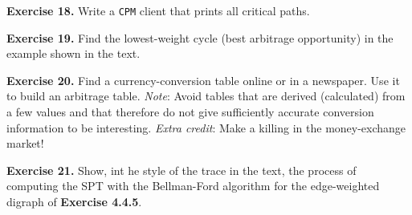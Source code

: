 \documentclass[12pt, a4paper]{article}
\newenvironment{ex}[2][Exercise]
{\par\medskip\noindent \textbf{#1 #2.}}
{\medskip}
\begin{document}
	\begin{ex}{18}
		Write a \texttt{CPM} client that prints all critical paths.
	\end{ex}
	\begin{ex}{19}
		Find the lowest-weight cycle (best arbitrage opportunity) in the example shown in
		the text.
	\end{ex}
	\begin{ex}{20}
		Find a currency-conversion table online or in a newspaper. Use it to build an
		arbitrage table. \emph{Note}: Avoid tables that are derived (calculated) from
		a few values and that therefore do not give sufficiently accurate conversion
		information to be interesting. \emph{Extra credit}: Make a killing in the
		money-exchange market!
	\end{ex}
	\begin{ex}{21}
		Show, int he style of the trace in the text, the process of computing the SPT with
		the Bellman-Ford algorithm for the edge-weighted digraph of \textbf{Exercise 4.4.5}.
	\end{ex}
	\pagebreak
	\printbibliography
\end{document}
